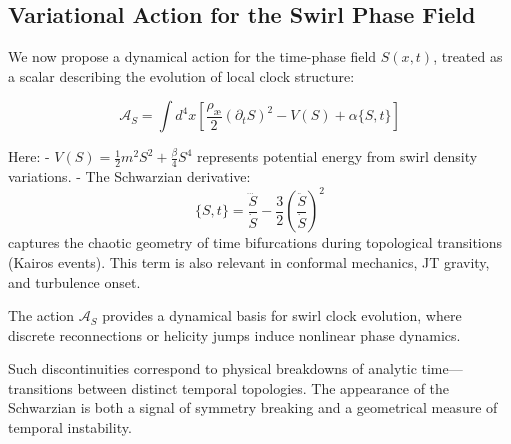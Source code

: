 \documentclass[12pt]{article}
\begin{document}
    \subsection{Variational Action for the Swirl Phase Field}

    We now propose a dynamical action for the time-phase field \( S(x, t) \), treated as a scalar describing the evolution of local clock structure:

    \[
        \mathcal{A}_S = \int d^4x \left[ \frac{\rho_{\text{\ae}}}{2} (\partial_t S)^2 - V(S) + \alpha \{S, t\} \right]
    \]

    Here:
    - \( V(S) = \frac{1}{2} m^2 S^2 + \frac{\beta}{4} S^4 \) represents potential energy from swirl density variations.
    - The Schwarzian derivative:
    \[
        \{S, t\} = \frac{\dddot{S}}{\dot{S}} - \frac{3}{2} \left( \frac{\ddot{S}}{\dot{S}} \right)^2
    \]
    captures the chaotic geometry of time bifurcations during topological transitions (Kairos events). This term is also relevant in conformal mechanics, JT gravity, and turbulence onset.

    The action \(\mathcal{A}_S\) provides a dynamical basis for swirl clock evolution, where discrete reconnections or helicity jumps induce nonlinear phase dynamics.

    Such discontinuities correspond to physical breakdowns of analytic time—transitions between distinct temporal topologies. The appearance of the Schwarzian is both a signal of symmetry breaking and a geometrical measure of temporal instability.
\end{document}
